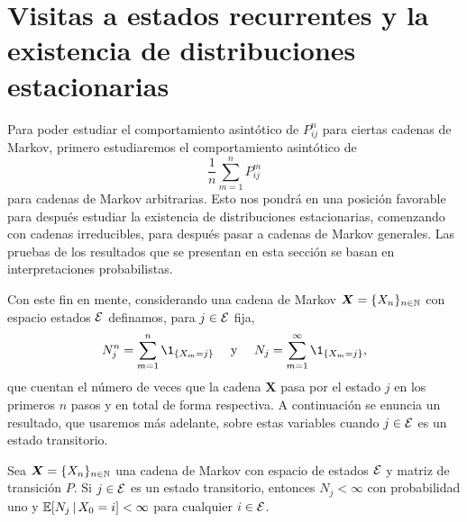 \section{Visitas a estados recurrentes y la existencia de distribuciones estacionarias}
\label{sec:existencia}

\noindent Para poder estudiar el comportamiento asintótico de $P_{ij}^n$ para ciertas cadenas de Markov, primero estudiaremos el comportamiento asintótico de 
\[
    \frac 1 n \sum_{m = 1}^n P_{ij}^m
\]
para cadenas de Markov arbitrarias. Esto nos pondrá en una posición favorable para después estudiar la existencia de distribuciones estacionarias, comenzando con cadenas irreducibles, para después pasar a cadenas de Markov generales. Las pruebas de los resultados que se presentan en esta sección se basan en interpretaciones probabilistas.

Con este fin en mente, considerando una cadena de Markov $\bm X = \{X_n\}_{n \in \mathbb{N}}$ con espacio estados $\mathcal{E}$ definamos, para $j \in \mathcal{E}$ fija,
\[
    N_j^n = \sum_{m = 1}^n \1_{\{X_m = j\}} \quad \text{ y } \quad N_j = \sum_{m = 1}^\infty  \1_{\{X_m = j\}},
\]
que cuentan el número de veces que la cadena $\bm X$ pasa por el estado $j$ en los primeros $n$ pasos y en total de forma respectiva. A continuación se enuncia un resultado, que usaremos más adelante, sobre estas variables cuando $j \in \mathcal{E}$ es un estado transitorio.

\begin{lemma}
    Sea $\bm X = \{X_n\}_{n \in \mathbb{N}}$ una cadena de Markov con espacio de estados $\mathcal{E}$ y matriz de transición $P$. Si $j \in \mathcal{E}$ es un estado transitorio, entonces $N_j < \infty$ con probabilidad uno y $\mathbb{E}[N_j \,\vert\, X_0 = i] < \infty$ para cualquier $i \in \mathcal{E}$.
\end{lemma}

